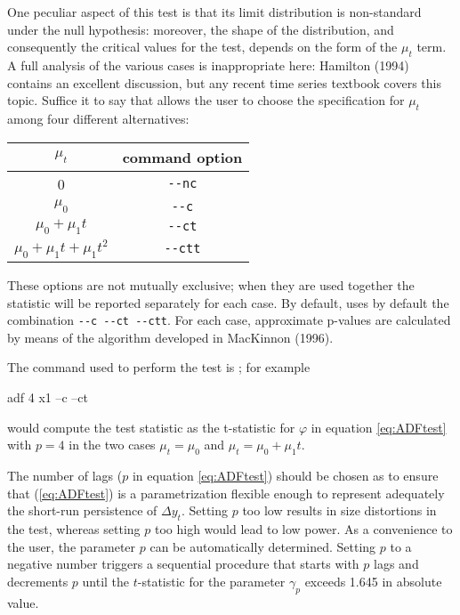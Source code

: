 One peculiar aspect of this test is that its limit distribution is
non-standard under the null hypothesis: moreover, the shape of the
distribution, and consequently the critical values for the test,
depends on the form of the $\mu_t$ term.  A full analysis of the
various cases is inappropriate here: Hamilton (1994) contains an
excellent discussion, but any recent time series textbook covers
this topic. Suffice it to say that  allows the user to
choose the specification for $\mu_t$ among four different
alternatives:

\begin{center}
  \begin{tabular}{cc}
    \hline
    $\mu_t$ & command option \\
    \hline
    0 & \verb|--nc| \\
    $\mu_0$ &  \verb|--c| \\
    $\mu_0 + \mu_1 t$ &  \verb|--ct| \\
    $\mu_0 + \mu_1 t + \mu_1 t^2$ &  \verb|--ctt| \\
    \hline
  \end{tabular}
\end{center}

These options are not mutually exclusive; when they are used together
the statistic will be reported separately for each case.  By default,
 uses by default the combination \verb|--c --ct --ctt|. For
each case, approximate p-values are calculated by means of the
algorithm developed in MacKinnon (1996).

The  command used to perform the test is ; for example
\begin{code}
  adf 4 x1 --c --ct
\end{code}
would compute the test statistic as the t-statistic for $\varphi$ in
equation \ref{eq:ADFtest} with $p=4$ in the two cases $\mu_t = \mu_0$
and $\mu_t = \mu_0 + \mu_1 t$.

The number of lags ($p$ in equation \ref{eq:ADFtest}) should be chosen
as to ensure that (\ref{eq:ADFtest}) is a parametrization flexible
enough to represent adequately the short-run persistence of $\Delta
y_t$. Setting $p$ too low results in size distortions in the test,
whereas setting $p$ too high would lead to low power. As a convenience
to the user, the parameter $p$ can be automatically determined.
Setting $p$ to a negative number triggers a sequential procedure that
starts with $p$ lags and decrements $p$ until the $t$-statistic for
the parameter $\gamma_p$ exceeds 1.645 in absolute value.


